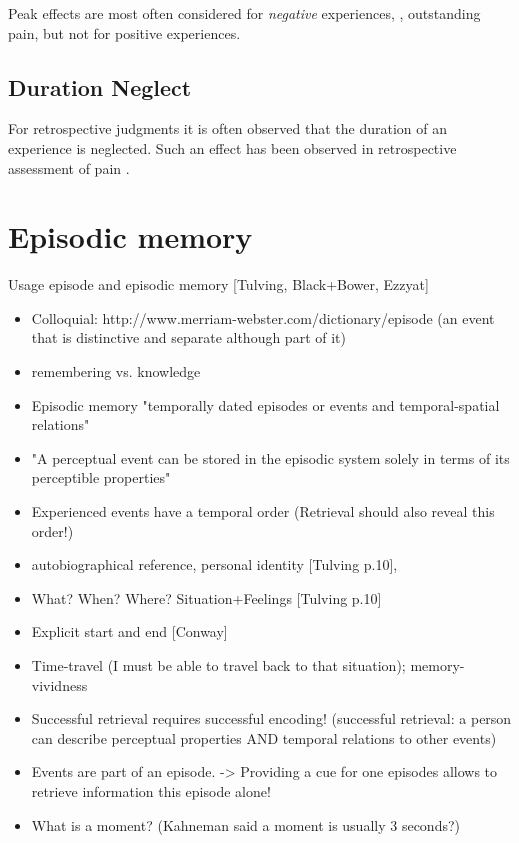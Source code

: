 Peak effects are most often considered for \emph{negative} experiences, \eg, outstanding pain, but not for positive experiences.

\subsection*{Duration Neglect}
For retrospective judgments it is often observed that the duration of an experience is neglected.
Such an effect has been observed in retrospective assessment of pain \citep[\cf,][]{fredrickson_duration_1993, ariely_combining_1998}.

\section{Episodic memory}
Usage episode and episodic memory [Tulving, Black+Bower, Ezzyat]
\begin{itemize}
\item Colloquial:  http://www.merriam-webster.com/dictionary/episode (an event that is distinctive and separate although part of it)
\item remembering vs. knowledge \cite{tulving_concepts_2000}

\item Episodic memory "temporally dated episodes or events and temporal-spatial relations" \cite[385]{tulving_concepts_2000}
\item "A perceptual event can be stored in the episodic system solely in terms of its perceptible properties"\cite[p. 385]{tulving_concepts_2000}
\item Experienced events have a temporal order (Retrieval should also reveal this order!)\cite{tulving_concepts_2000}

\item autobiographical reference, personal identity [Tulving p.10], \cite{conway_construction_????}
\item What? When? Where? Situation+Feelings [Tulving p.10]
\item Explicit start and end [Conway]
\item Time-travel (I must be able to travel back to that situation); memory-vividness \cite{conway_construction_????}

      
\item Successful retrieval requires successful encoding! (successful retrieval: a person can describe perceptual properties AND temporal relations to other events)

\item Events are part of an episode. -> Providing a cue for one episodes allows to retrieve information this episode alone!
\item What is a moment? (Kahneman said a moment is usually 3 seconds?)
\end{itemize}

